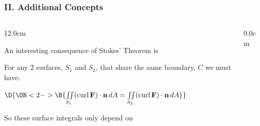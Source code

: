\begin{frame}
\frametitle{II. Additional Concepts}
\scriptsize
\begin{columns}
\begin{column}{12.0cm}

\vspace{0.2cm}

An interesting consequence of Stokes' Theorem is  

\vspace{0.2cm}

For any 2 surfaces, $S_1$ and $S_2$, that share the same boundary, $C$ we must have:

\vspace{0.2cm}

\begin{center}
	$\D{\ON<2->{\B{\iint \limits_{S_1}(\text{curl}\,{\bf F}) \cdot {\bf n} \, dA = \iint \limits_{S_2}(\text{curl}\,{\bf F}) \cdot {\bf n} \, dA}}}$
\end{center}

\vspace{0.2cm}

So these surface integrals only depend on 

\vspace{8.2cm}

\end{column}
\begin{column}{0.0cm}\end{column}
\end{columns}
\end{frame}

